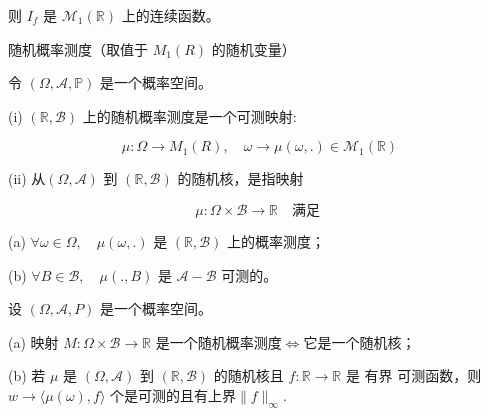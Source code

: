 则 $ I_f $ 是 $ \mathcal{M}_1(\mathbb{R}) $ 上的连续函数。



随机概率测度（取值于 $ M_1(R) $ 的随机变量）

\begin{definition}
    令 $ (\Omega, \mathcal{A}, \mathbb{P}) $ 是一个概率空间。

(i) $ (\mathbb{R},\mathcal{B} ) $ 上的随机概率测度是一个可测映射:

\[ \mu : \Omega \to M_1(R), \quad \omega \to \mu(\omega,.) \in \mathcal{M}_1(\mathbb{R}) \]

(ii) 从$ (\Omega, \mathcal{A}) $ 到 $ (\mathbb{R},\mathcal{B}) $ 的随机核，是指映射

\[ \mu : \Omega \times \mathcal{B} \to \mathbb{R} \quad \text{满足 }\]

(a) $ \forall \omega \in \Omega, \quad \mu(\omega,.) $ 是 $  (\mathbb{R},\mathcal{B} )$ 上的概率测度；

(b) $ \forall B \in\mathcal{B}, \quad \mu(.,B) $ 是 $ \mathcal{A}-\mathcal{B} $ 可测的。
\end{definition}

\begin{lemma}设 $ (\Omega, \mathcal{A}, P) $ 是一个概率空间。

(a) 映射 $ M: \Omega \times \mathcal{B} \to \mathbb{R} $ 是一个随机概率测度$\iff$它是一个随机核；

(b) 若 $ \mu $ 是 $ (\Omega, \mathcal{A}) $ 到 $ (\mathbb{R}, \mathcal{B}) $ 的随机核且 $ f:\mathbb{R} \to \mathbb{R} $ 是
有界 可测函数，则 $ w \rightarrow \langle\mu(\omega),f\rangle $ 个是可测的且有上界$\|f\|_{\infty}$.
\end{lemma}

